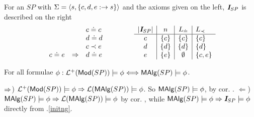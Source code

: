 \documentclass[12pt]{article}
\begin{document}
%
\begin{Example}
For an $SP$ with $\Sigma=\langle s,\{c,d,e:\rightarrow s\}\rangle$ and the axioms given on the
left, $\mbox{\bf{\em I}}_{SP}$ is described on the right
\[\begin{array}{l@{\hspace*{4em}}l}
 \begin{array}{rcl}
 & & c\eleq c \\ && d\eleq d \\ && c \incl e \\ c\eleq e & \impl & d\eleq e
\end{array}
& 
 \begin{array}{c|c|c|l}
\car{\init_{SP}}  &  n    & \Le   & \Li \\ \hline
c & \{c\} & \{c\} & \{c\}  \\
d & \{d\} & \{d\} & \{d\}  \\
e & \{e\} & \emptyset & \{c,e\}
\end{array}
\end{array}
\]
\end{Example}
%
\begin{Corollary}\label{co:liftall}
For all formulae $\phi :{\cal L}^+({\sf {Mod}}(SP))\models\phi\Longleftrightarrow {\sf MAlg}(SP)\models \phi$.
\end{Corollary}
\begin{Proof} 
$\Rightarrow$) ${\cal L}^+({\sf {Mod}}(SP))\models\phi \Rightarrow {\cal L}({\sf MAlg}(SP))\models\phi$. So
 ${\sf MAlg}(SP)\models\phi$, by cor. . $\Leftarrow$)
${\sf MAlg}(SP)\models \phi \Rightarrow {\cal L}({\sf MAlg}(SP))\models\phi$ by cor. , while
${\sf MAlg}(SP)\models \phi \Rightarrow \mbox{\bf{\em I}}_{SP}\models\phi$ directly from .\ref{initng}.
\end{Proof}
\end{document}

